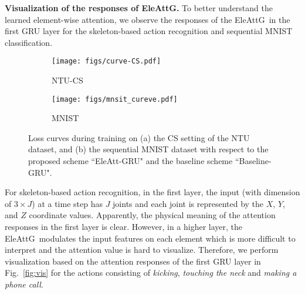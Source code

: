\documentclass[journal]{IEEEtran}
\newcommand{\EleAttGn}{{EleAttG}}
\newcommand{\EleAttG}{{EleAttG~}}
\begin{document}
\textbf{Visualization of the responses of \EleAttGn.} To better understand the learned element-wise attention, we observe the responses of the \EleAttG in the first GRU layer for the skeleton-based action recognition and sequential MNIST classification. 








\begin{figure*}[!]
	\centering
	\begin{subfigure}[t]{0.41\linewidth}
		\centering\texttt{[image: figs/curve-CS.pdf]}
		\caption{NTU-CS}
		\label{subfig:CS}
	\end{subfigure}	
	\hfil
	\begin{subfigure}[t]{0.41\linewidth}
    	\centering\texttt{[image: figs/mnsit\_cureve.pdf]}
    	\caption{MNIST}			
    	\label{subfig:CV}
    \end{subfigure}
	\caption{Loss curves during training on (a) the CS setting of the NTU dataset, and (b) the sequential MNIST dataset with respect to the proposed scheme ``EleAtt-GRU" and the baseline scheme ``Baseline-GRU".}
	\label{fig:curve}
\end{figure*}



For skeleton-based action recognition, in the first layer, the input (with dimension of $3\times J$) at a time step has $J$ joints and each joint is represented by the $X$, $Y$, and $Z$ coordinate values. Apparently, the physical meaning of the attention responses in the first layer is clear. However, in a higher layer, the \EleAttG modulates the input features on each element which is more difficult to interpret and the attention value is hard to visualize. Therefore, we perform visualization based on the attention responses of the first GRU layer in Fig.~\ref{fig:vis} for the actions consisting of \emph{kicking}, \emph{touching the neck} and \emph{making a phone call}. 
\end{document}
